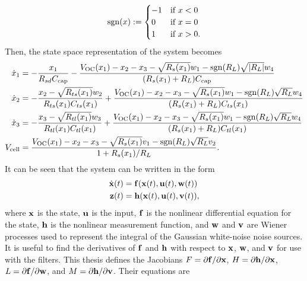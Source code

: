 \documentclass[../zhang_thesis.tex]{subfiles}
\begin{document}
\begin{equation}
    \operatorname{sgn}(x) := \begin{cases}
        -1 & \text{if } x<0 \\
        0 & \text{if } x=0 \\
        1 & \text{if } x>0.
    \end{cases}
\end{equation}
Then, the state space representation of the system becomes
\begin{align}
    \dot{x}_1 &= - \frac{x_1}{R_{sd}C_\text{cap}} - \frac{V_\text{OC}(x_1) - x_2 - x_3 - \sqrt{R_s(x_1)}w_1 - \operatorname{sgn}(R_L)\sqrt{|R_L|}w_4}{(R_s(x_1)+R_L)C_\text{cap}} \\
    \dot{x}_2 &= - \frac{x_2 - \sqrt{R_{ts}(x_1)}w_2}{R_{ts}(x_1)C_{ts}(x_1)} + \frac{V_\text{OC}(x_1) - x_2 - x_3 - \sqrt{R_s(x_1)}w_1 - \operatorname{sgn}(R_L)\sqrt{R_L}w_4}{(R_s(x_1)+R_L)C_{ts}(x_1)} \\
    \dot{x}_3 &= - \frac{x_3 - \sqrt{R_{tl}(x_1)}w_3}{R_{tl}(x_1)C_{tl}(x_1)} + \frac{V_\text{OC}(x_1) - x_2 - x_3 - \sqrt{R_s(x_1)}w_1 - \operatorname{sgn}(R_L)\sqrt{R_L}w_4}{(R_s(x_1)+R_L)C_{tl}(x_1)} \\
    V_\text{cell} &= \frac{V_\text{OC}(x_1) - x_2 - x_3 - \sqrt{R_s(x_1)}v_1 - \operatorname{sgn}(R_L)\sqrt{R_L}v_2}{1+R_s(x_1)/R_L}.
\end{align}
It can be seen that the system can be written in the form
\begin{align}
    \dot{\mathbf{x}}(t) &= \mathbf{f}(\mathbf{x}(t),\mathbf{u}(t),\mathbf{w}(t)) \\
    \mathbf{z}(t) &= \mathbf{h}(\mathbf{x}(t),\mathbf{u}(t),\mathbf{v}(t)),
\end{align}
where $\mathbf{x}$ is the state, $\mathbf{u}$ is the input, $\mathbf{f}$ is the nonlinear differential equation for the state, $\mathbf{h}$ is the nonlinear measurement function, and $\mathbf{w}$ and $\mathbf{v}$ are Wiener processes used to represent the integral of the Gaussian white-noise noise sources. It is useful to find the derivatives of $\mathbf{f}$ and $\mathbf{h}$ with respect to $\mathbf{x}$, $\mathbf{w}$, and $\mathbf{v}$ for use with the filters. This thesis defines the Jacobians $F=\partial\mathbf{f}/\partial\mathbf{x}$, $H=\partial\mathbf{h}/\partial\mathbf{x}$,
$L=\partial\mathbf{f}/\partial\mathbf{w}$, and $M=\partial\mathbf{h}/\partial\mathbf{v}$. Their equations are
\end{document}
